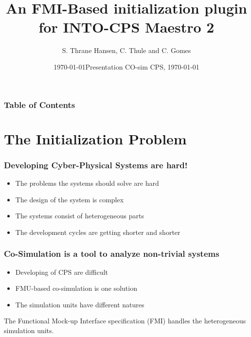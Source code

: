 \documentclass{beamer}
\title[FMI-Based initialization plugin for Maestro 2] %
{An FMI-Based initialization plugin for INTO-CPS Maestro 2}
\date{\today}
\author[Thrane Hansen, Simon] %
{S. Thrane Hansen\inst{1}, C. Thule\inst{1} and C. Gomes\inst{1}}
\institute[AU] %
{
  \inst{1}%
  Department of Engineering\\
  Computer Engineering \\
  Aarhus University
}
\date[AU 2020] %
{Presentation CO-sim CPS, \today}
\begin{document}
\frame{\titlepage}

\begin{frame}
\frametitle{Table of Contents}
\tableofcontents
\end{frame}

\section{The Initialization Problem}
\begin{frame}
\frametitle{Developing Cyber-Physical Systems are hard!}
\begin{itemize}
    \item The problems the systems should solve are hard
    \item The design of the system is complex
    \item The systems consist of heterogeneous parts
    \item The development cycles are getting shorter and shorter
\end{itemize}

\end{frame}

\begin{frame}
\frametitle{Co-Simulation is a tool to analyze \textbf{non-trivial} systems}
\begin{itemize}
    \item Developing of CPS are difficult
    \item FMU-based co-simulation is one solution
    \item The simulation units have different natures
\end{itemize}
The Functional Mock-up Interface specification (FMI) handles the heterogeneous simulation units.

\end{frame}
\end{document}
